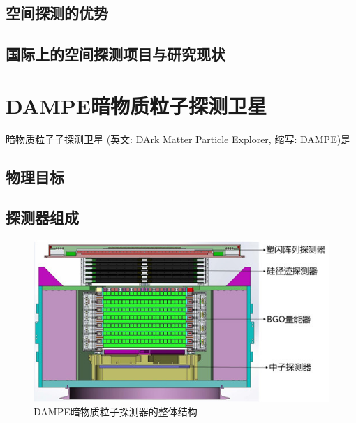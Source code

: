 \subsection{空间探测的优势}

\subsection{国际上的空间探测项目与研究现状}

\section{DAMPE暗物质粒子探测卫星}

暗物质粒子子探测卫星 (英文: DArk Matter Particle Explorer, 缩写: DAMPE)是
\subsection{物理目标}
\subsection{探测器组成}
\begin{figure}
\centering
\includegraphics[width=0.9\linewidth]{chap/introduction/fig/dampe_structure_2}
\caption{DAMPE暗物质粒子探测器的整体结构}
\label{fig:dampe_structure}
\end{figure}
